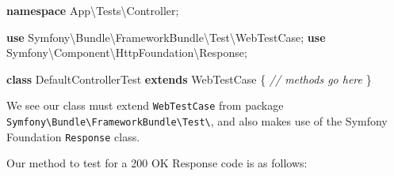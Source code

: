 \documentclass[a4paperpaper,openright]{book}
\newenvironment{Shaded}{}{}
\newcommand{\CommentTok}[1]{\textcolor[rgb]{0.38,0.63,0.69}{\textit{#1}}}
\newcommand{\KeywordTok}[1]{\textcolor[rgb]{0.00,0.44,0.13}{\textbf{#1}}}
\newcommand{\NormalTok}[1]{#1}
\newcommand{\OtherTok}[1]{\textcolor[rgb]{0.00,0.44,0.13}{#1}}
\newcommand{\StringTok}[1]{\textcolor[rgb]{0.25,0.44,0.63}{#1}}
\begin{document}
\begin{Shaded}
\begin{Highlighting}[]
    \KeywordTok{namespace}\NormalTok{ App\textbackslash{}Tests\textbackslash{}Controller}\OtherTok{;}

    \KeywordTok{use}\NormalTok{ Symfony\textbackslash{}Bundle\textbackslash{}FrameworkBundle\textbackslash{}Test\textbackslash{}WebTestCase}\OtherTok{;}
    \KeywordTok{use}\NormalTok{ Symfony\textbackslash{}Component\textbackslash{}HttpFoundation\textbackslash{}Response}\OtherTok{;}

    \KeywordTok{class}\NormalTok{ DefaultControllerTest }\KeywordTok{extends}\NormalTok{ WebTestCase}
\NormalTok{    \{}
        \CommentTok{// methods go here}
\NormalTok{    \}}
\end{Highlighting}
\end{Shaded}

We see our class must extend \texttt{WebTestCase} from package
\texttt{Symfony\textbackslash{}Bundle\textbackslash{}FrameworkBundle\textbackslash{}Test\textbackslash{}},
and also makes use of the Symfony Foundation \texttt{Response} class.

Our method to test for a 200 OK Response code is as follows:

\begin{Shaded}
\end{Shaded}
\end{document}
